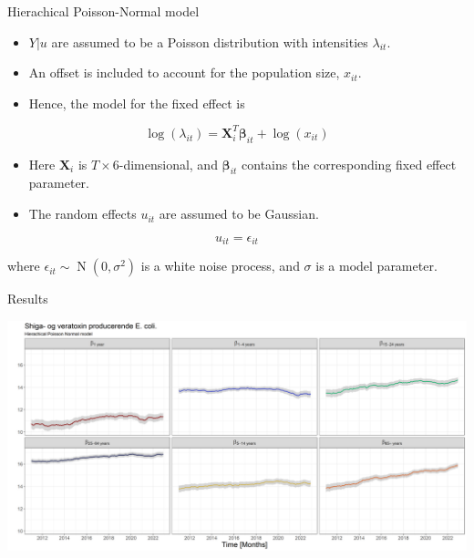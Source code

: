 \documentclass[aspectratio=169]{beamer}
\DeclareMathOperator{\N}{N}
\begin{document}
\begin{frame}{Hierachical Poisson-Normal model}
\protect\hypertarget{hierachical-poisson-normal-model-1}{}
\begin{itemize}
  \item $Y|u$ are assumed to be a Poisson distribution with intensities $\lambda_{it}$.
  \item An offset is included to account for the population size, $x_{it}$.
  \item Hence, the model for the fixed effect is
\end{itemize}

\begin{equation}
  \log(\lambda_{it})=\mathbf{X}_i^T\mathbf{\beta}_{it}+\log(x_{it})
\end{equation}

\begin{itemize}
  \item Here $\mathbf{X}_i$ is $T\times6$-dimensional, and $\mathbf{\beta}_{it}$ contains the corresponding fixed effect parameter.
  \item The random effects $u_{it}$ are assumed to be Gaussian.
\end{itemize}

\begin{equation}
  u_{it} = \epsilon_{it}
\end{equation}

where \(\epsilon_{it}\sim\N(0,\sigma^2)\) is a white noise process, and
\(\sigma\) is a model parameter.
\end{frame}

\begin{frame}{Results}
\protect\hypertarget{results}{}
\tiny

\includegraphics[width=1\linewidth]{../figures/thetaSTECPoisNExclude}

\normalsize
\end{frame}
\end{document}
